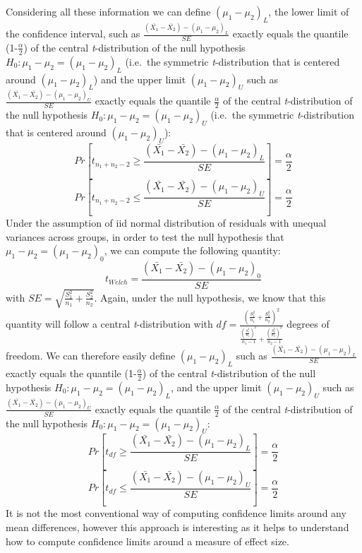 \documentclass[
  english,
  man,floatsintext]{apa6}
\begin{document}
Considering all these information we can define \((\mu_1-\mu_2)_L\), the lower limit of the confidence interval, such as \(\frac{(\bar{X_1}-\bar{X_2})-(\mu_1-\mu_2)_L}{SE}\) exactly equals the quantile (1-\(\frac{\alpha}{2}\)) of the central \emph{t}-distribution of the null hypothesis \(H_0: \mu_1 - \mu_2 = (\mu_1-\mu_2)_L\) (i.e.~the symmetric \emph{t}-distribution that is centered around \((\mu_1-\mu_2)_L\)) and the upper limit \((\mu_1-\mu_2)_U\) such as \(\frac{(\bar{X_1}-\bar{X_2})-(\mu_1-\mu_2)_U}{SE}\) exactly equals the quantile \(\frac{\alpha}{2}\) of the central \emph{t}-distribution of the null hypothesis \(H_0: \mu_1 - \mu_2 = (\mu_1-\mu_2)_U\) (i.e.~the symmetric \emph{t}-distribution that is centered around \((\mu_1-\mu_2)_U\)):
\begin{equation*} 
Pr[t_{n_1+n_2-2} \geq \frac{(\bar{X_1}-\bar{X_2})-(\mu_1-\mu_2)_L}{SE}]= \frac{\alpha}{2}
\label{eq:plausiblelimit1}
\end{equation*}
\begin{equation*} 
Pr[t_{n_1+n_2-2} \leq \frac{(\bar{X_1}-\bar{X_2})-(\mu_1-\mu_2)_U}{SE}]= \frac{\alpha}{2}
\label{eq:plausiblelimit2}
\end{equation*}
Under the assumption of iid normal distribution of residuals with unequal variances across groups, in order to test the null hypothesis that \(\mu_1-\mu_2= (\mu_1-\mu_2)_0\), we can compute the following quantity:
\begin{equation*} 
t_{Welch}=\frac{(\bar{X_1}-\bar{X_2})-(\mu_1-\mu_2)_0}{SE}
\label{eq:twelch}
\end{equation*}
with \(SE = \sqrt{\frac{S^2_1}{n_1}+\frac{S^2_2}{n_2}}\). Again, under the null hypothesis, we know that this quantity will follow a central \emph{t}-distribution with \(df=\frac{(\frac{S^2_1}{n_1}+\frac{S^2_2}{n_2})^2}{\frac{(\frac{S^2_1}{n_1})^2}{n_1-1}+\frac{(\frac{S^2_2}{n_2})^2}{n_2-1}}\) degrees of freedom. We can therefore easily define \((\mu_1-\mu_2)_L\) such as \(\frac{(\bar{X_1}-\bar{X_2})-(\mu_1-\mu_2)_L}{SE}\) exactly equals the quantile (1-\(\frac{\alpha}{2}\)) of the central \emph{t}-distribution of the null hypothesis \(H_0: \mu_1 - \mu_2 = (\mu_1-\mu_2)_L\), and the upper limit \((\mu_1-\mu_2)_U\) such as \(\frac{(\bar{X_1}-\bar{X_2})-(\mu_1-\mu_2)_U}{SE}\) exactly equals the quantile \(\frac{\alpha}{2}\) of the central \emph{t}-distribution of the null hypothesis \(H_0: \mu_1 - \mu_2 = (\mu_1-\mu_2)_U\):
\begin{equation*} 
Pr[t_{df} \geq \frac{(\bar{X_1}-\bar{X_2})-(\mu_1-\mu_2)_L}{SE}]= \frac{\alpha}{2}
\label{eq:plausiblelimit1}
\end{equation*}
\begin{equation*} 
Pr[t_{df} \leq \frac{(\bar{X_1}-\bar{X_2})-(\mu_1-\mu_2)_U}{SE}]= \frac{\alpha}{2}
\label{eq:plausiblelimit2}
\end{equation*}
It is not the most conventional way of computing confidence limits around any mean differences, however this approach is interesting as it helps to understand how to compute confidence limits around a measure of effect size.
\end{document}

